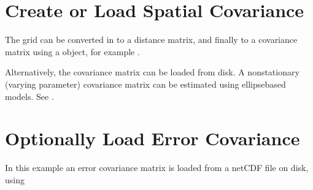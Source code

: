 \documentclass[letterpaper,10pt,english]{sphinxmanual}
\begin{document}
\section{Create or Load Spatial Covariance}
\label{\detokenize{workflow:create-or-load-spatial-covariance}}
\sphinxAtStartPar
The grid can be converted in to a distance matrix, and finally to a covariance matrix using a
 object, for example
{\hyperref[\detokenize{covariance:glomar_gridding.variogram.GaussianVariogram}]{}}.

\begin{sphinxVerbatim}[commandchars=\\\{\}]
  

  

   
\end{sphinxVerbatim}

\sphinxAtStartPar
Alternatively, the covariance matrix can be loaded from disk. A non\sphinxhyphen{}stationary (varying parameter)
covariance matrix can be estimated using ellipse\sphinxhyphen{}based models. See
{\hyperref[\detokenize{ellipse:glomar_gridding.ellipse.EllipseModel}]{}}.


\section{Optionally Load Error Covariance}
\label{\detokenize{workflow:optionally-load-error-covariance}}
\sphinxAtStartPar
In this example an error covariance matrix is loaded from a netCDF file on disk, using
{\hyperref[\detokenize{misc:glomar_gridding.io.load_array}]{}}
\end{document}
